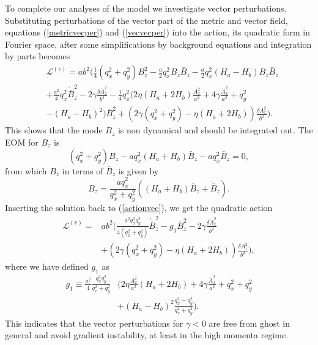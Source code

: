 \documentclass[%
 reprint,
 amsmath,amssymb,
 aps,
]{revtex4-1}
\begin{document}
To complete our analyses of the model we investigate  vector perturbations. Substituting  perturbations  of the vector part of the metric and vector field, equations (\ref{metricvecper}) and (\ref{vecvecper}) into the action, its quadratic form in Fourier space, after some simplifications by background equations and integration by parts becomes
\begin{equation}\label{actionvec}
\begin{split}
&\mathcal{L}^{(v)}=ab^2\Biggl(\frac{1}{4}(q_x^2+q_y^2)B_z^2-\frac{a}{2}q_x^2B_z\dot{\bar{B}}_z-\frac{a}{2}q_x^2(H_a-H_b)B_z\bar{B}_z\\
&+\frac{a^2}{4}q_x^2\dot{\bar{B}}_z^2-2\gamma \frac{\delta\dot{A}_z^2}{b^2}-\frac{1}{4}q_x^2(2\eta (H_a +2H_b)\frac{A_x^2}{a^2}+4\gamma\frac{\dot{A}_x^2}{a^2}+q_y^2\\
&-(H_a-H_b)^2)\bar{B}_z^2+(2 \gamma(q_x^2+q_y^2)-\eta(H_a+2 H_b))\frac{\delta A_z^2}{b^2}\Biggr).
\end{split}
\end{equation}
This shows that the mode $B_z$ is non dynamical and should be integrated out. The EOM for $B_z$ is
\begin{equation}
(q_x^2+q_y^2)B_z-aq_x^2(H_a+H_b)\bar{B}_z-aq_x^2\dot{\bar{B}}_z=0,
\end{equation}
from which  $B_z$ in terms of $\bar{B}_z$ is given by
\begin{equation}
B_z=\frac{a q_x^2}{q_x^2+q_y^2}((H_a+H_b)\bar{B}_z+\dot{\bar{B}}_z).
\end{equation}
Inserting the solution back to (\ref{actionvec}), we get the quadratic action
\begin{equation}
\begin{split}
\mathcal{L}^{(v)}=&ab^2\biggr(\frac{a^2 q_x^2q_y^2}{4(q_x^2+q_y^2)}\dot{\bar{B}}_z^2-g_1 \bar{B}_z^2-2\gamma\frac{\delta\dot{A}_z^2}{b^2}\\
&+(2\gamma(q_x^2+q_y^2)-\eta (H_a+2H_b))\frac{\delta A_z^2}{b^2}\biggr),
\end{split}
\end{equation}
where we have defined $g_1$ as
\begin{equation}
\begin{split}
g_1\equiv \frac{a^2}{4}\frac{q_x^2q_y^2}{q_x^2+q_y^2}&\biggl( 2\eta\frac{A_x^2}{a^2}(H_a+2H_b)+4\gamma\frac{\dot{A}_x^2}{a^2}+q_x^2+q_y^2\\
&+(H_a-H_b)^2\frac{q_x^2-q_y^2}{q_x^2+q_y^2}\biggr).
\end{split}
\end{equation}
This indicates that the vector perturbations for $\gamma<0$ are free from ghost in general and avoid gradient instability, at least in the high momenta regime.
\end{document}
